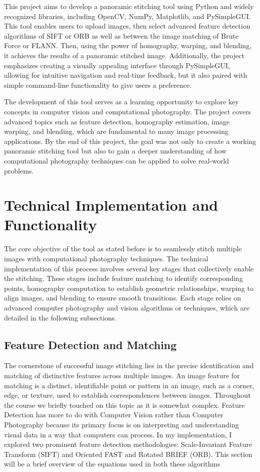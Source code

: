 \documentclass[12pt, letterpaper, ]{article}
\begin{document}
This project aims to develop a panoramic stitching tool using Python and widely recognized libraries, including OpenCV, NumPy, Matplotlib, and PySimpleGUI. This tool enables users to upload images, then select advanced feature detection algorithms of SIFT or ORB as well as between the image matching of Brute Force or FLANN. Then, using the power of homography, warping, and blending, it achieves the results of a panoramic stitched image. Additionally, the project emphasizes creating a visually appealing interface through PySimpleGUI, allowing for intuitive navigation and real-time feedback, but it also paired with simple command-line functionality to give users a preference.

The development of this tool serves as a learning opportunity to explore key concepts in computer vision and computational photography. The project covers advanced topics such as feature detection, homography estimation, image warping, and blending, which are fundamental to many image processing applications. By the end of this project, the goal was not only to create a working panoramic stitching tool but also to gain a deeper understanding of how computational photography techniques can be applied to solve real-world problems.


\section{Technical Implementation and Functionality}
\label{sec:Technical Implementation and Functionality}
The core objective of the tool as stated before is to seamlessly stitch multiple images with computational photography techniques. The technical implementation of this process involves several key stages that collectively enable the stitching. These stages include feature matching to identify corresponding points, homography computation to establish geometric relationships, warping to align images, and blending to ensure smooth transitions. Each stage relies on advanced computer photography and vision algorithms or techniques, which are detailed in the following subsections.

\subsection{Feature Detection and Matching}
The cornerstone of successful image stitching lies in the precise identification and matching of distinctive features across multiple images. An image feature for matching is a distinct, identifiable point or pattern in an image, such as a corner, edge, or texture, used to establish correspondences between images.
Throughout the course we briefly touched on this topic as it is somewhat complex. Feature Detection has more to do with Computer Vision rather than Computer Photography because its primary focus is on interpreting and understanding visual data in a way that computers can process. In my implementation, I explored two prominent feature detection methodologies: Scale-Invariant Feature Transform (SIFT) and Oriented FAST and Rotated BRIEF (ORB). This section will be a brief overview of the equations used in both these algorithms 
\end{document}
